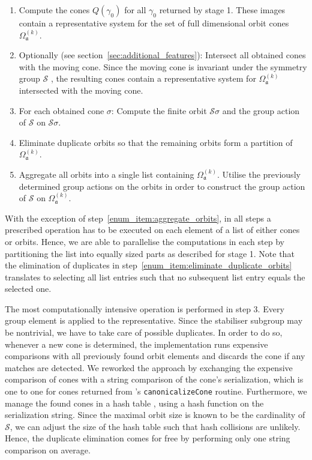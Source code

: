 \begin{enumerate}
	\item Compute the cones $Q(\gamma_0)$ for all \afaces{} $\gamma_0$ returned by stage 1. These images contain a representative system for the set of full dimensional orbit cones $\Omega_\mathfrak{a}^{(k)}$. 
	\item Optionally (see section~\ref{sec:additional_features}): Intersect all obtained cones with the moving cone. Since the moving cone is invariant under the symmetry group $\mathcal{S}$ , the resulting cones contain a representative system for $\Omega_\mathfrak{a}^{(k)}$ intersected with the moving cone.
	\item For each obtained cone $\sigma$: Compute the finite orbit $\mathcal{S}\sigma$ and the group action of $\mathcal{S}$ on $\mathcal{S}\sigma$.
	\item Eliminate duplicate orbits so that the remaining orbits form a partition of $\Omega_\mathfrak{a}^{(k)}$. \label{enum_item:eliminate_duplicate_orbits}
	\item Aggregate all orbits into a single list containing $\Omega_\mathfrak{a}^{(k)}$. Utilise the previously determined group actions on the orbits in order to construct the group action of $\mathcal{S}$ on $\Omega_\mathfrak{a}^{(k)}$. \label{enum_item:aggregate_orbits}
\end{enumerate}

With the exception of step~\ref{enum_item:aggregate_orbits}, in all steps a prescribed operation has to be executed on each element of a list of either cones or orbits. Hence, we are able to parallelise the computations in each step by partitioning the list into equally sized parts as described for stage 1. Note that the elimination of duplicates in step~\ref{enum_item:eliminate_duplicate_orbits} translates to selecting all list entries such that no subsequent list entry equals the selected one.

The most computationally intensive operation is performed in step 3. Every group element is applied to the representative. Since the stabiliser subgroup may be nontrivial, we have to take care of possible duplicates. In order to do so, whenever a new cone is determined, the \gitfanlib{} implementation runs expensive comparisons with all previously found orbit elements and discards the cone if any matches are detected. We reworked the approach by
exchanging the expensive comparison of cones with a string comparison of the cone's serialization, which is one to one for cones returned from \singular's \texttt{canonicalizeCone} routine. Furthermore, we manage the found cones in a hash table , using a hash function on the serialization string. Since the maximal orbit size is known to be the cardinality of $\mathcal{S}$, we can adjust the size of the hash table such that hash collisions are unlikely. Hence, the duplicate elimination comes for free by performing only one string comparison on average.

